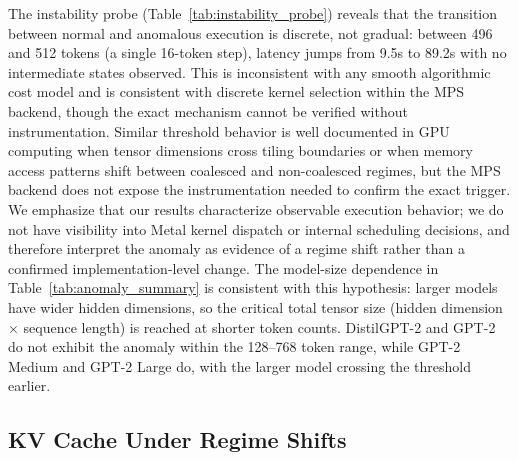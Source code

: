 \documentclass{article}
\begin{document}
The instability probe (Table~\ref{tab:instability_probe}) reveals that the transition between normal and anomalous execution is discrete, not gradual: between 496 and 512 tokens (a single 16-token step), latency jumps from 9.5s to 89.2s with no intermediate states observed.
This is inconsistent with any smooth algorithmic cost model and is consistent with discrete kernel selection within the MPS backend, though the exact mechanism cannot be verified without instrumentation.
Similar threshold behavior is well documented in GPU computing when tensor dimensions cross tiling boundaries or when memory access patterns shift between coalesced and non-coalesced regimes, but the MPS backend does not expose the instrumentation needed to confirm the exact trigger.
We emphasize that our results characterize observable execution behavior; we do not have visibility into Metal kernel dispatch or internal scheduling decisions, and therefore interpret the anomaly as evidence of a regime shift rather than a confirmed implementation-level change.
The model-size dependence in Table~\ref{tab:anomaly_summary} is consistent with this hypothesis: larger models have wider hidden dimensions, so the critical total tensor size (hidden dimension $\times$ sequence length) is reached at shorter token counts.
DistilGPT-2 and GPT-2 do not exhibit the anomaly within the 128--768 token range, while GPT-2 Medium and GPT-2 Large do, with the larger model crossing the threshold earlier.

\subsection{KV Cache Under Regime Shifts}
\end{document}
